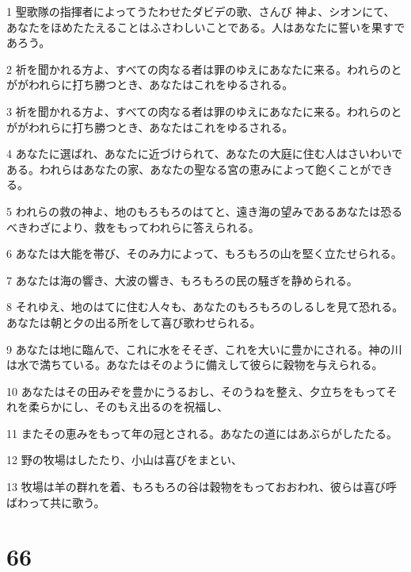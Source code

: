 \par 1 聖歌隊の指揮者によってうたわせたダビデの歌、さんび 神よ、シオンにて、あなたをほめたたえることはふさわしいことである。人はあなたに誓いを果すであろう。
\par 2 祈を聞かれる方よ、すべての肉なる者は罪のゆえにあなたに来る。われらのとががわれらに打ち勝つとき、あなたはこれをゆるされる。
\par 3 祈を聞かれる方よ、すべての肉なる者は罪のゆえにあなたに来る。われらのとががわれらに打ち勝つとき、あなたはこれをゆるされる。
\par 4 あなたに選ばれ、あなたに近づけられて、あなたの大庭に住む人はさいわいである。われらはあなたの家、あなたの聖なる宮の恵みによって飽くことができる。
\par 5 われらの救の神よ、地のもろもろのはてと、遠き海の望みであるあなたは恐るべきわざにより、救をもってわれらに答えられる。
\par 6 あなたは大能を帯び、そのみ力によって、もろもろの山を堅く立たせられる。
\par 7 あなたは海の響き、大波の響き、もろもろの民の騒ぎを静められる。
\par 8 それゆえ、地のはてに住む人々も、あなたのもろもろのしるしを見て恐れる。あなたは朝と夕の出る所をして喜び歌わせられる。
\par 9 あなたは地に臨んで、これに水をそそぎ、これを大いに豊かにされる。神の川は水で満ちている。あなたはそのように備えして彼らに穀物を与えられる。
\par 10 あなたはその田みぞを豊かにうるおし、そのうねを整え、夕立ちをもってそれを柔らかにし、そのもえ出るのを祝福し、
\par 11 またその恵みをもって年の冠とされる。あなたの道にはあぶらがしたたる。
\par 12 野の牧場はしたたり、小山は喜びをまとい、
\par 13 牧場は羊の群れを着、もろもろの谷は穀物をもっておおわれ、彼らは喜び呼ばわって共に歌う。

\chapter{66}

